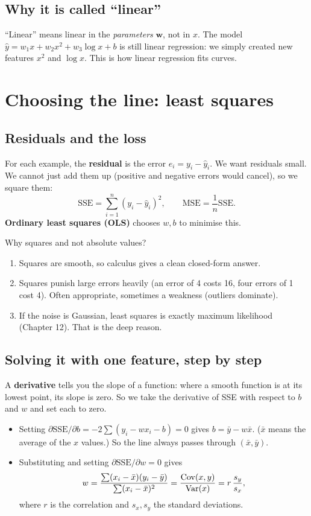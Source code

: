 \subsection{Why it is called ``linear''}
``Linear'' means linear in the \emph{parameters} $\mathbf w$, not in $x$. The model
$\hat y = w_1 x + w_2 x^2 + w_3\log x + b$ is still linear regression: we simply created new features
$x^2$ and $\log x$. This is how linear regression fits curves.

\section{Choosing the line: least squares}

\subsection{Residuals and the loss}
For each example, the \textbf{residual} is the error $e_i = y_i - \hat y_i$. We want residuals small. We
cannot just add them up (positive and negative errors would cancel), so we square them:
\[ \text{SSE} = \sum_{i=1}^n (y_i - \hat y_i)^2, \qquad \text{MSE} = \frac{1}{n}\text{SSE}. \]
\textbf{Ordinary least squares (OLS)} chooses $w, b$ to minimise this.

Why squares and not absolute values?
\begin{enumerate}
\item Squares are smooth, so calculus gives a clean closed-form answer.
\item Squares punish large errors heavily (an error of 4 costs 16, four errors of 1 cost 4). Often
  appropriate, sometimes a weakness (outliers dominate).
\item If the noise is Gaussian, least squares is exactly maximum likelihood (Chapter 12). That is the deep
  reason.
\end{enumerate}

\subsection{Solving it with one feature, step by step}
A \textbf{derivative} tells you the slope of a function: where a smooth function is at its lowest point, its
slope is zero. So we take the derivative of SSE with respect to $b$ and $w$ and set each to zero.
\begin{itemize}
\item Setting $\partial\text{SSE}/\partial b = -2\sum(y_i - wx_i - b) = 0$ gives $b = \bar y - w\bar x$.
  ($\bar x$ means the average of the $x$ values.) So the line always passes through $(\bar x, \bar y)$.
\item Substituting and setting $\partial\text{SSE}/\partial w = 0$ gives
  \[ w = \frac{\sum (x_i - \bar x)(y_i - \bar y)}{\sum (x_i - \bar x)^2} = \frac{\operatorname{Cov}(x,y)}{\operatorname{Var}(x)} = r\,\frac{s_y}{s_x}, \]
  where $r$ is the correlation and $s_x, s_y$ the standard deviations.
\end{itemize}

